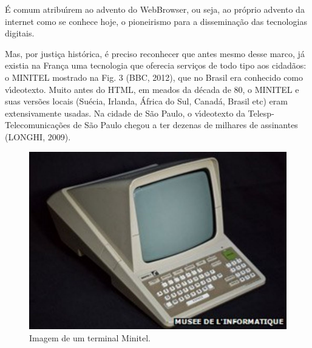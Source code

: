 \documentclass[
12pt,		%
openright,	%
twoside,  %
a4paper,			%
chapter=TITLE,		%
english,			%
french,				%
spanish,			%
brazil				%
]{USPSC-classe/USPSC}
\begin{document}
\'E comum atribu\'{\i}rem ao advento do WebBrowser, ou seja, ao pr\'oprio advento da internet como se conhece hoje, o pioneirismo para a dissemina\c{c}\~ao das tecnologias digitais.









Mas, por justi\c{c}a hist\'orica, \'e preciso reconhecer que antes mesmo desse marco, j\'a existia na Fran\c{c}a uma tecnologia que oferecia servi\c{c}os de todo tipo aos cidad\~aos: o MINITEL mostrado na Fig. 3 (BBC, 2012), que no Brasil era conhecido como v\'{\i}deotexto. Muito antes do HTML, em meados da d\'ecada de 80, o MINITEL e suas vers\~oes locais (Su\'ecia, Irlanda, \'Africa do Sul, Canad\'a, Brasil etc) eram extensivamente usadas. Na cidade de S\~ao Paulo, o v\'{\i}deotexto da Telesp- Telecomunica\c{c}\~oes de S\~ao Paulo chegou a ter dezenas de milhares de assinantes (LONGHI, 2009).











\captionsetup{format=plain}
\begin{figure}[max size={\textwidth}{\textheight}]

\centering


\begin{minipage}[b]{0.4\linewidth}
        \centering
                \includegraphics[width=1.0\linewidth]{../../imagens/minitel.jpg}
                \caption{Imagem de um terminal Minitel.}
                \label{5d9a2782548e094108d5241aeff768916b33be6c}
\end{minipage}%
\hspace{0.5cm}
\end{figure}
\end{document}
